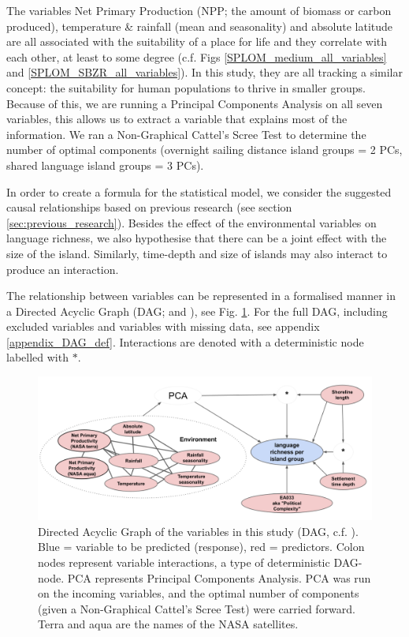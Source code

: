 \documentclass[a4paper,10pt]{article} %
\begin{document}
The variables Net Primary Production (NPP; the amount of biomass or carbon produced), temperature \& rainfall (mean and seasonality) and absolute latitude are all associated with the suitability of a place for life and they correlate with each other, at least to some degree (c.f. Figs \ref{SPLOM_medium_all_variables} and \ref{SPLOM_SBZR_all_variables}). In this study, they are all tracking a similar concept: the suitability for human populations to thrive in smaller groups. Because of this, we are running a Principal Components Analysis on all seven variables, this allows us to extract a variable that explains most of the information. We ran a Non-Graphical Cattel's Scree Test \citep{cattell1966scree, R-nFactors} to determine the number of optimal components (overnight sailing distance island groups = 2 PCs, shared language island groups = 3 PCs).

In order to create a formula for the statistical model, we consider the suggested causal relationships based on previous research (see section \ref{sec:previous_research}). Besides the effect of the environmental variables on language richness, we also hypothesise that there can be a joint effect with the size of the island. Similarly, time-depth and size of islands may also interact to produce an interaction. 

The relationship between variables can be represented in a formalised manner in a Directed Acyclic Graph (DAG; \citet{pearl1995causal} and \citet{mcelreath2020statistical}), see Fig. \ref{Predicting_lgs_DAG_slimmed}. For the full DAG, including excluded variables and variables with missing data, see appendix \ref{appendix_DAG_def}. Interactions are denoted with a deterministic node labelled with $\ast$. 

\begin{figure}[h!]
\centering
\includegraphics[width=16cm]{Predicting_lgs_DAG_slimmed.png}
\caption{Directed Acyclic Graph of the variables in this study (DAG, c.f. \cite{mcelreath2020statistical}). Blue = variable to be predicted (response), red = predictors. Colon nodes represent variable interactions, a type of deterministic DAG-node. PCA represents Principal Components Analysis. PCA was run on the incoming variables, and the optimal number of components (given a Non-Graphical Cattel's Scree Test) were carried forward. Terra and aqua are the names of the NASA satellites.}
\label{Predicting_lgs_DAG_slimmed}
\end{figure}
\end{document}
